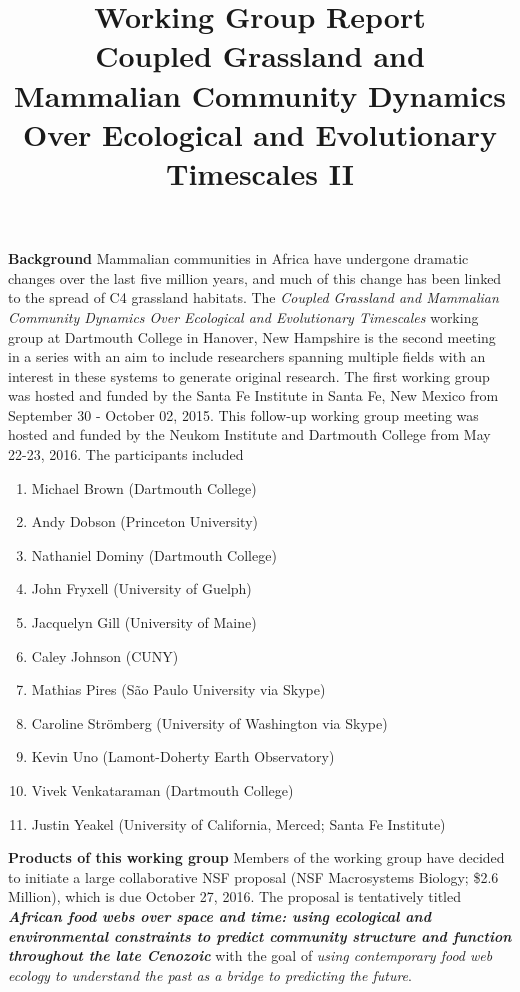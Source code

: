\documentclass{article}[10pt]
\title{Working Group Report \\ 
Coupled Grassland and Mammalian Community Dynamics Over Ecological and Evolutionary Timescales II}
\begin{document}
\maketitle

{\bf Background} Mammalian communities in Africa have undergone dramatic changes over the last five million years, and much of this change has been linked to the spread of C4 grassland habitats.
The \emph{Coupled Grassland and Mammalian Community Dynamics Over Ecological and Evolutionary Timescales} working group at Dartmouth College in Hanover, New Hampshire is the second meeting in a series with an aim to include researchers spanning multiple fields with an interest in these systems to generate original research.
The first working group was hosted and funded by the Santa Fe Institute in Santa Fe, New Mexico from September 30 - October 02, 2015.
This follow-up working group meeting was hosted and funded by the Neukom Institute and Dartmouth College from May 22-23, 2016.
The participants included

\begin{enumerate}
\item Michael Brown (Dartmouth College)
\item Andy Dobson (Princeton University)
\item Nathaniel Dominy (Dartmouth College)
\item John Fryxell (University of Guelph)
\item Jacquelyn Gill (University of Maine)
\item Caley Johnson (CUNY)
\item Mathias Pires (S\~ao Paulo University via Skype)
\item Caroline Str\"omberg (University of Washington via Skype)
\item Kevin Uno (Lamont-Doherty Earth Observatory)
\item Vivek Venkataraman (Dartmouth College)
\item Justin Yeakel (University of California, Merced; Santa Fe Institute)
\end{enumerate}

\vspace{5 mm}

{\bf Products of this working group} Members of the working group have decided to initiate a large collaborative NSF proposal (NSF Macrosystems Biology; \$2.6 Million), which is due October 27, 2016. 
The proposal is tentatively titled {\bf \emph{African food webs over space and time: using ecological and environmental constraints to predict community structure and function throughout the late Cenozoic}} with the goal of \emph{using contemporary food web ecology to understand the past as a bridge to predicting the future}.
\end{document}
